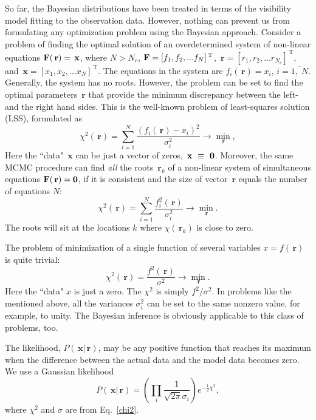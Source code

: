 \documentclass[preprint2]{aastex}
\newcommand{\bfr}{\,\mathbf{r}}
\newcommand{\bfx}{\,\mathbf{x}}
\newcommand{\uT}{\,\mathrm{T}}
\begin{document}
So far, the Bayesian distributions have been treated in terms of the visibility model fitting to the observation data. However, nothing can prevent us from formulating any optimization problem using the Bayesian approach. Consider a problem of finding the optimal solution of an overdetermined system of non-linear equations ${\bf F}(\bfr) = \bfx$, where $N > N_r$, ${\bf F} = [f_1, f_2, ... f_N]^{\uT}$, $\bfr = [r_1, r_2, ... r_{N_r}]^{\uT}$, and $\bfx = [x_1, x_2, ... x_N]^{\uT}$. The equations in the system are $f_i(\bfr) = x_i$, $i = \overline{1,\;N}$. Generally, the system has no roots. However, the problem can be set to find the optimal parameters $\bfr$ that provide the minimum discrepancy between the left- and the right hand sides. This is the well-known problem of least-squares solution (LSS), formulated as   
\begin{equation}
  \label{nonlin_sys_opt}
  \chi^2(\bfr) = \sum_{i=1}^{N} \frac{(f_i(\bfr) - x_i)^2}{\sigma_i^2}  \rightarrow {\min\limits_{\bfr}},
\end{equation}
Here the ``data" $\bfx$ can be just a vector of zeros, $\bfx~\equiv~{\bf 0}$. Moreover, the same MCMC procedure can find \emph{all} the roots $\bfr_k$ of a non-linear system of simultaneous equations ${\bf F}(\bfr) = {\bf 0}$, if it is consistent and the size of vector $\bfr$ equals the number of equations $N$:
\begin{equation}
  \label{vec_fun_opt}
  \chi^2(\bfr) = \sum_{i=1}^{N} \frac{f_i^2(\bfr)}{\sigma_i^2}  \rightarrow {\min\limits_{\bfr}}.
\end{equation}
The roots will sit at the locations $k$ where $\chi(\bfr_k)$ is close to zero.

The problem of minimization of a single function of several variables $x = f(\bfr)$ is quite trivial:
\begin{equation}
  \label{single_fun_opt}
  \chi^2(\bfr) =  \frac{f^2(\bfr)}{\sigma^2} \rightarrow {\min\limits_{\bfr}}.
\end{equation}
Here the ``data" $x$ is just a zero. The $\chi^2$ is simply $f^2/\sigma^2$. In problems like the mentioned above, all the variances $\sigma_i^2$ can be set to the same nonzero value, for example, to unity. The Bayesian inference is obviously applicable to this class of problems, too.


The likelihood, $P(\bfx|\bfr)$, may be any positive function that reaches its maximum when the difference between the actual data and the model data becomes zero. We use a Gaussian likelihood
\begin{equation}
  \label{gaussian_likelihood}
  P(\bfx|\bfr) = \left(\prod_i \frac{1}{\sqrt{2 \pi} \sigma_i} \right) e^{-\frac{1}{2}\chi^2},
\end{equation}
where $\chi^2$ and $\sigma$ are from Eq.~\eqref{chi2}.
\end{document}
